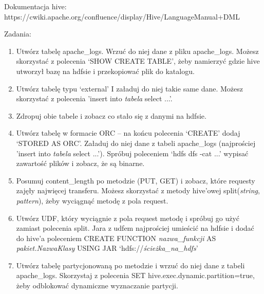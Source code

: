 \documentclass[11pt]{article}
\begin{document}
Dokumentacja hive:
https://cwiki.apache.org/confluence/display/Hive/LanguageManual+DML

Zadania:
\begin{enumerate}
\item Utwórz tabelę apache\_logs. Wrzuć do niej dane z pliku apache\_logs. Możesz skorzystać z polecenia ‘SHOW CREATE TABLE’, żeby namierzyć gdzie hive utworzył bazę na hdfsie i przekopiować plik do katalogu.
\item Utwórz tabelę typu ‘external’ I załaduj do niej takie same dane. Możesz skorzystać z polecenia 'insert into \textit{tabela} select ...'.
\item Zdropuj obie tabele i zobacz co stało się z danymi na hdfsie.
\item Utwórz tabelę w formacie ORC – na końcu polecenia ‘CREATE’ dodaj ‘STORED AS ORC’. Załaduj do niej dane z tabeli apache\_logs (najprościej 'insert into \textit{tabela} select ...'). Spróbuj poleceniem ‘hdfs dfs -cat ...’ wypisać zawartość plików i zobacz, że są binarne.
\item Posumuj content\_length po metodzie (PUT, GET) i zobacz, które requesty zajęły najwięcej transferu. Możesz skorzystać z metody hive’owej split(\textit{string}, \textit{pattern}), żeby wyciągnąć metodę z pola request.
\item Utwórz UDF, który wyciągnie z pola request metodę i spróbuj go użyć zamiast polecenia split. Jara z udfem najprościej umieścić na hdfsie i dodać do hive’a poleceniem CREATE FUNCTION \textit{nazwa\_funkcji} AS \textit{pakiet.NazwaKlasy} USING JAR ‘hdfs://\textit{ścieżka\_na\_hdfs}’
\item Utwórz tabelę partycjonowaną po metodzie i wrzuć do niej dane z tabeli apache\_logs. Skorzystaj z polecenia SET hive.exec.dynamic.partition=true, żeby odblokować dynamiczne wyznaczanie partycji.
\end{enumerate}
\end{document}
